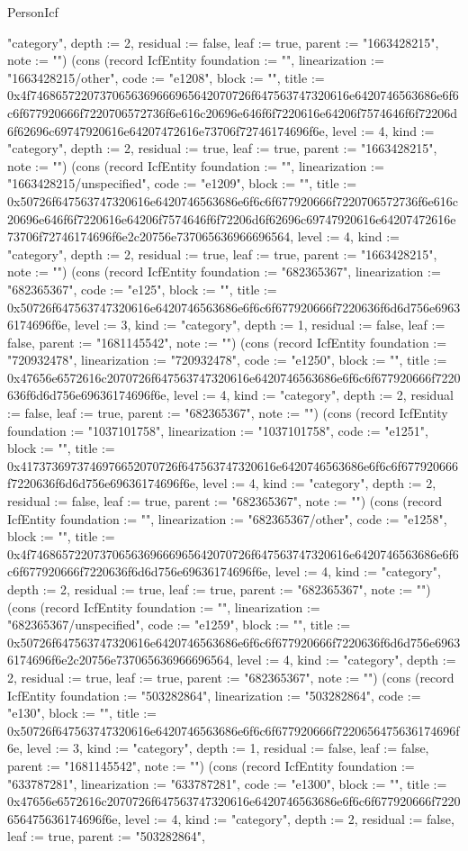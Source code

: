 \begin{lexlean}{PersonIcf}
\begin{semanticmodule}
{"category", depth := 2, residual := false, leaf := true, parent := "1663428215", note := ""}) (cons (record IcfEntity {foundation := "", linearization := "1663428215/other", code := "e1208", block := "", title := 0x4f74686572207370656369666965642070726f647563747320616e6420746563686e6f6c6f677920666f7220706572736f6e616c20696e646f6f7220616e64206f7574646f6f72206d6f62696c69747920616e64207472616e73706f72746174696f6e, level := 4, kind := "category", depth := 2, residual := true, leaf := true, parent := "1663428215", note := ""}) (cons (record IcfEntity {foundation := "", linearization := "1663428215/unspecified", code := "e1209", block := "", title := 0x50726f647563747320616e6420746563686e6f6c6f677920666f7220706572736f6e616c20696e646f6f7220616e64206f7574646f6f72206d6f62696c69747920616e64207472616e73706f72746174696f6e2c20756e737065636966696564, level := 4, kind := "category", depth := 2, residual := true, leaf := true, parent := "1663428215", note := ""}) (cons (record IcfEntity {foundation := "682365367", linearization := "682365367", code := "e125", block := "", title := 0x50726f647563747320616e6420746563686e6f6c6f677920666f7220636f6d6d756e69636174696f6e, level := 3, kind := "category", depth := 1, residual := false, leaf := false, parent := "1681145542", note := ""}) (cons (record IcfEntity {foundation := "720932478", linearization := "720932478", code := "e1250", block := "", title := 0x47656e6572616c2070726f647563747320616e6420746563686e6f6c6f677920666f7220636f6d6d756e69636174696f6e, level := 4, kind := "category", depth := 2, residual := false, leaf := true, parent := "682365367", note := ""}) (cons (record IcfEntity {foundation := "1037101758", linearization := "1037101758", code := "e1251", block := "", title := 0x4173736973746976652070726f647563747320616e6420746563686e6f6c6f677920666f7220636f6d6d756e69636174696f6e, level := 4, kind := "category", depth := 2, residual := false, leaf := true, parent := "682365367", note := ""}) (cons (record IcfEntity {foundation := "", linearization := "682365367/other", code := "e1258", block := "", title := 0x4f74686572207370656369666965642070726f647563747320616e6420746563686e6f6c6f677920666f7220636f6d6d756e69636174696f6e, level := 4, kind := "category", depth := 2, residual := true, leaf := true, parent := "682365367", note := ""}) (cons (record IcfEntity {foundation := "", linearization := "682365367/unspecified", code := "e1259", block := "", title := 0x50726f647563747320616e6420746563686e6f6c6f677920666f7220636f6d6d756e69636174696f6e2c20756e737065636966696564, level := 4, kind := "category", depth := 2, residual := true, leaf := true, parent := "682365367", note := ""}) (cons (record IcfEntity {foundation := "503282864", linearization := "503282864", code := "e130", block := "", title := 0x50726f647563747320616e6420746563686e6f6c6f677920666f7220656475636174696f6e, level := 3, kind := "category", depth := 1, residual := false, leaf := false, parent := "1681145542", note := ""}) (cons (record IcfEntity {foundation := "633787281", linearization := "633787281", code := "e1300", block := "", title := 0x47656e6572616c2070726f647563747320616e6420746563686e6f6c6f677920666f7220656475636174696f6e, level := 4, kind := "category", depth := 2, residual := false, leaf := true, parent := "503282864", }
\end{semanticmodule}
\end{lexlean}
